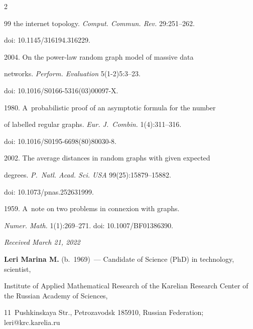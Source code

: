 \begin{multicols}{2}
{{\begin{thebibliography}{99}
the internet topology. \textit{Comput. Commun. Rev.} 29:251--262.

doi: 10.1145/316194.316229.




 2004. On the power-law random graph model of massive data

networks. \textit{Perform. Evaluation} 5(1-2)5:3--23.

doi: 10.1016/S0166-5316(03)00097-X.




 1980. A~probabilistic proof of an asymptotic formula for the number

of labelled regular graphs. \textit{Eur. J.~Combin.} 1(4):311--316.

doi: 10.1016/S0195-6698(80)80030-8.




 2002. The average distances in random graphs with given expected

degrees. \textit{P.~Natl. Acad. Sci. USA} 99(25):15879--15882.

doi: 10.1073/pnas.252631999.




 1959. A~note on two problems in connexion with graphs.

\textit{Numer. Math.} 1(1):269--271. doi: 10.1007/BF01386390.

\end{thebibliography}



 }

 }



\end{multicols}



\vspace*{-6pt}



\hfill{\small\textit{Received March 21, 2022}}





\Contrl



\noindent

\textbf{Leri Marina M.} (b.\ 1969)~--- Candidate of Science (PhD) in technology, scientist,

Institute of Applied Mathematical Research of the Karelian Research Center of the Russian Academy of Sciences,

11~Pushkinskaya Str., Petrozavodsk 185910, Russian Federation; \mbox{leri@krc.karelia.ru}





\label{end\stat}



\renewcommand{\bibname}{\protect\rm Литература} 

